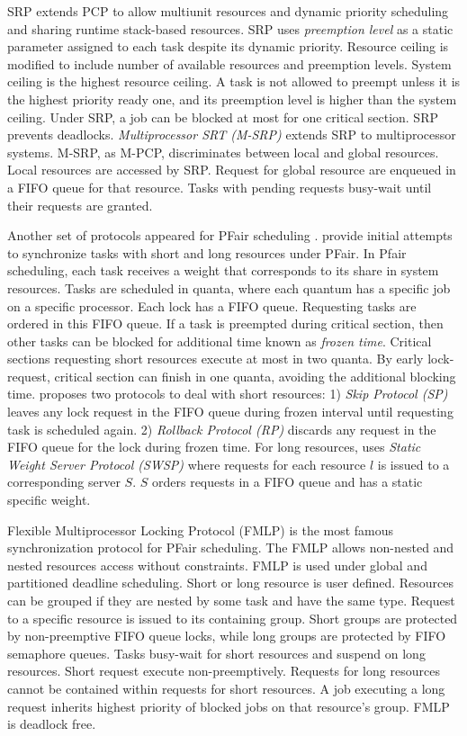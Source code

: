 SRP \cite{Buttazzo:2004:HRC:1027504,baker1991stack,990598} extends
PCP to allow multiunit resources and dynamic priority scheduling and
sharing runtime stack-based resources. SRP uses \textit{preemption
level} as a static parameter assigned to each task despite its dynamic
priority. Resource ceiling is modified to include number of available
resources and preemption levels. System ceiling is the highest resource
ceiling. A task is not allowed to preempt unless it is the highest
priority ready one, and its preemption level is higher than the system
ceiling. Under SRP, a job can be blocked at most for one critical
section. SRP prevents deadlocks. \textit{Multiprocessor SRT (M-SRP)}
\cite{gai2003comparison} extends SRP to multiprocessor systems. M-SRP,
as M-PCP, discriminates between local and global resources. Local
resources are accessed by SRP. Request for global resource are enqueued
in a FIFO queue for that resource. Tasks with pending requests busy-wait
until their requests are granted.

Another set of protocols appeared for PFair scheduling \cite{key-4}.
\cite{1181570} provide initial attempts to synchronize tasks with
short and long resources under PFair. In Pfair scheduling, each task
receives a weight that corresponds to its share in system resources.
Tasks are scheduled in quanta, where each quantum has a specific job
on a specific processor. Each lock has a FIFO queue. Requesting tasks
are ordered in this FIFO queue. If a task is preempted during critical
section, then other tasks can be blocked for additional time known
as \textit{frozen time}. Critical sections requesting short resources
execute at most in two quanta. By early lock-request, critical section
can finish in one quanta, avoiding the additional blocking time. \cite{1181570}
proposes two protocols to deal with short resources: 1)\textit{ Skip
Protocol (SP) }leaves any lock request in the FIFO queue during frozen
interval until requesting task is scheduled again. 2) \textit{Rollback
Protocol (RP)} discards any request in the FIFO queue for the lock
during frozen time. For long resources, \cite{1181570} uses \textit{Static
Weight Server Protocol (SWSP)} where requests for each resource $l$
is issued to a corresponding server $S$. $S$ orders requests in
a FIFO queue and has a static specific weight.

Flexible Multiprocessor Locking Protocol (FMLP) \cite{key-4} is the
most famous synchronization protocol for PFair scheduling. The FMLP
allows non-nested and nested resources access without constraints.
FMLP is used under global and partitioned deadline scheduling. Short
or long resource is user defined. Resources can be grouped if they
are nested by some task and have the same type. Request to a specific
resource is issued to its containing group. Short groups are protected
by non-preemptive FIFO queue locks, while long groups are protected
by FIFO semaphore queues. Tasks busy-wait for short resources and
suspend on long resources. Short request execute non-preemptively.
Requests for long resources cannot be contained within requests for
short resources. A job executing a long request inherits highest priority
of blocked jobs on that resource's group. FMLP is deadlock free.


